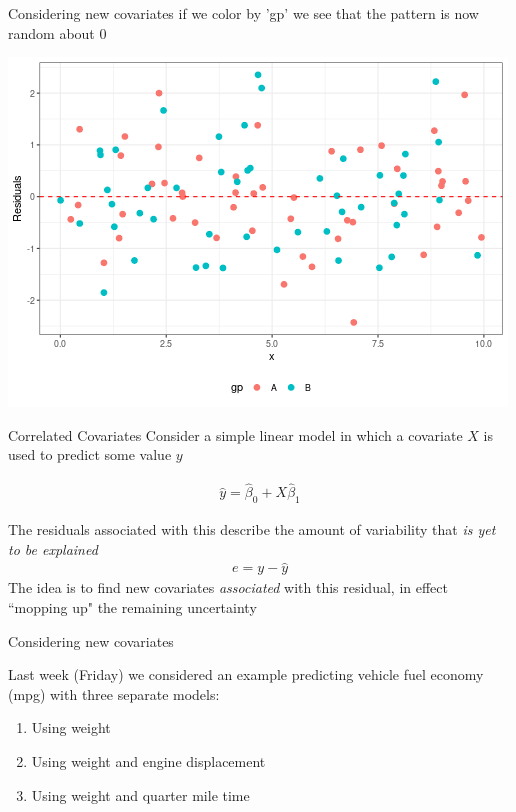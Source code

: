 \documentclass{beamer}
\begin{document}
\begin{frame}{Considering new covariates}
if we color by 'gp' we see that the pattern is now random about 0
\begin{center}
\includegraphics[scale=0.5]{have_cat2.png}
\end{center}
\end{frame}


\begin{frame}{Correlated Covariates}
Consider a simple linear model in which a covariate $X$ is used to predict some value $y$

\begin{align*}
\hat{y} = \hat{\beta}_0 + X \hat{\beta}_1 
\end{align*}

The residuals associated with this describe the amount of variability that \textit{is yet to be explained}
\begin{align*}
e = y - \hat{y}
\end{align*}
The idea is to find new covariates \textit{associated} with this residual, in effect ``mopping up" the remaining uncertainty
\end{frame}


\begin{frame}{Considering new covariates}

Last week (Friday) we considered an example predicting vehicle fuel economy (mpg) with three separate models:

\begin{enumerate}
\item Using weight
\item Using weight and engine displacement
\item Using weight and quarter mile time
\end{enumerate}


\end{frame}
\end{document}

